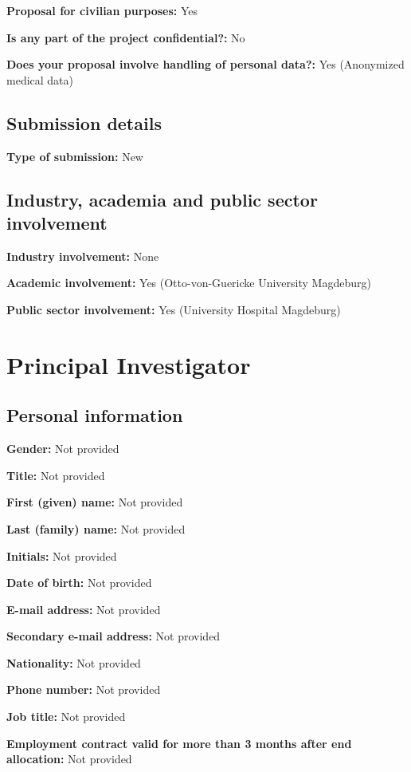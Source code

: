 \documentclass[12pt,a4paper]{article}
\begin{document}
\textbf{Proposal for civilian purposes:} Yes

\textbf{Is any part of the project confidential?:} No

\textbf{Does your proposal involve handling of personal data?:} Yes (Anonymized medical data)



\subsection*{Submission details}

\textbf{Type of submission:} New

\subsection*{Industry, academia and public sector involvement}

\textbf{Industry involvement:} None

\textbf{Academic involvement:} Yes (Otto-von-Guericke University Magdeburg)

\textbf{Public sector involvement:} Yes (University Hospital Magdeburg)

\section*{Principal Investigator}

\subsection*{Personal information}

\textbf{Gender:} Not provided

\textbf{Title:} Not provided

\textbf{First (given) name:} Not provided

\textbf{Last (family) name:} Not provided

\textbf{Initials:} Not provided

\textbf{Date of birth:} Not provided

\textbf{E-mail address:} Not provided

\textbf{Secondary e-mail address:} Not provided

\textbf{Nationality:} Not provided

\textbf{Phone number:} Not provided

\textbf{Job title:} Not provided

\textbf{Employment contract valid for more than 3 months after end allocation:} Not provided
\end{document}
